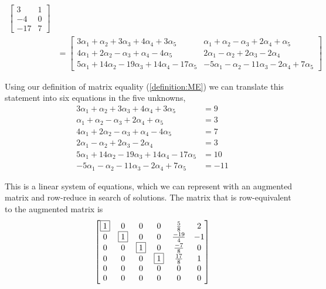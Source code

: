 \documentclass{ximera}
\begin{document}
\begin{example}[A subspace of $M_{32}$]
\begin{align*}
\begin{bmatrix}
                                                                                                                3 & 1 \\ -4 & 0 \\ -17 & 7
                                                                                                              \end{bmatrix}\\
    &=
      \begin{bmatrix}
        3\alpha_1 +\alpha_2 +3\alpha_3 +4\alpha_4 +3\alpha_5 &
        \alpha_1 +\alpha_2 -\alpha_3 +2\alpha_4 +\alpha_5\\
        4\alpha_1 +2\alpha_2 -\alpha_3 +\alpha_4 -4\alpha_5&
        2\alpha_1 -\alpha_2 +2\alpha_3 -2\alpha_4 \\
        5\alpha_1 +14\alpha_2 -19\alpha_3 +14\alpha_4 -17\alpha_5&
        -5\alpha_1 -\alpha_2 -11\alpha_3 -2\alpha_4 +7\alpha_5
      \end{bmatrix}
  \end{align*}

  Using our definition of matrix equality (\ref{definition:ME}) we can
  translate this statement into six equations in the five unknowns,
  \begin{align*}
    3\alpha_1 +\alpha_2 +3\alpha_3 +4\alpha_4 +3\alpha_5& =9\\
    \alpha_1 +\alpha_2 -\alpha_3 +2\alpha_4 +\alpha_5& =3\\
    4\alpha_1 +2\alpha_2 -\alpha_3 +\alpha_4 -4\alpha_5& =7\\
    2\alpha_1 -\alpha_2 +2\alpha_3 -2\alpha_4 & =3\\
    5\alpha_1 +14\alpha_2 -19\alpha_3 +14\alpha_4 -17\alpha_5& =10\\
    -5\alpha_1 -\alpha_2 -11\alpha_3 -2\alpha_4 +7\alpha_5&=-11
  \end{align*}

  This is a linear system of equations, which we can represent with an
  augmented matrix and row-reduce in search of solutions.  The matrix
  that is row-equivalent to the augmented matrix is
  \[
    \begin{bmatrix}
      \fbox{1} & 0 & 0 & 0 & \frac{5}{8} & 2\\
      0 & \fbox{1} & 0 & 0 & \frac{-19}{4} & -1\\
      0 & 0 & \fbox{1} & 0 & \frac{-7}{8} & 0\\
      0 & 0 & 0 & \fbox{1} & \frac{17}{8} & 1\\
      0 & 0 & 0 & 0 & 0 & 0\\
      0 & 0 & 0 & 0 & 0 & 0
    \end{bmatrix}
  \]


\end{example}
\end{document}
